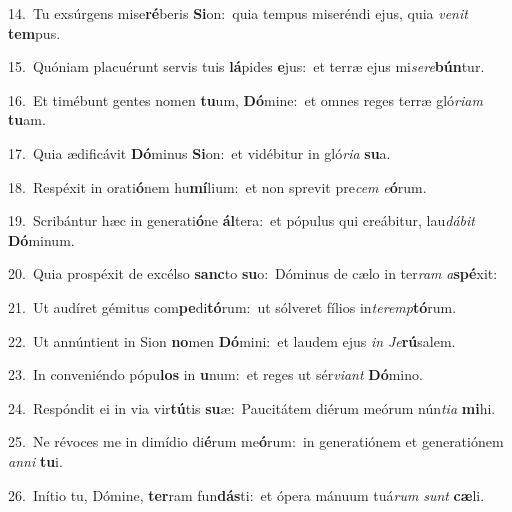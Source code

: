 {\numbfont\textcolor{\numbcolor}{14.}}~Tu exsúrgens mise\-\textbf{ré}\-beris \textbf{Si}\-on:~\star quia tempus miseréndi ejus, quia \textit{ve}\-\textit{nit} \textbf{tem}\-pus.\par
{\numbfont\textcolor{\numbcolor}{15.}}~Quóniam placuérunt servis tuis \textbf{lá}\-pides \textbf{e}\-jus:~\star et terræ ejus mi\-\textit{se}\-\textit{re}\textbf{bún}tur.\par
{\numbfont\textcolor{\numbcolor}{16.}}~Et timébunt gentes nomen \textbf{tu}\-um, \textbf{Dó}\-mine:~\star et omnes reges terræ gló\-\textit{ri}\-\textit{am} \textbf{tu}\-am.\par
{\numbfont\textcolor{\numbcolor}{17.}}~Quia ædificávit \textbf{Dó}\-minus \textbf{Si}\-on:~\star et vidébitur in gló\-\textit{ri}\-\textit{a} \textbf{su}\-a.\par
{\numbfont\textcolor{\numbcolor}{18.}}~Respéxit in orati\-\textbf{ó}\-nem hu\-\textbf{mí}\-lium:~\star et non sprevit pre\textit{cem} \textit{e}\-\textbf{ó}rum.\par
{\numbfont\textcolor{\numbcolor}{19.}}~Scribántur hæc in generati\-\textbf{ó}\-ne \textbf{ál}\-tera:~\star et pópulus qui creábitur, lau\-\textit{dá}\-\textit{bit} \textbf{Dó}\-minum.\par
{\numbfont\textcolor{\numbcolor}{20.}}~Quia prospéxit de excélso \textbf{sanc}\-to \textbf{su}\-o:~\star Dóminus de cælo in ter\textit{ram} \textit{a}\-\textbf{spé}xit:\par
{\numbfont\textcolor{\numbcolor}{21.}}~Ut audíret gémitus com\-\textbf{pe}\-di\-\textbf{tó}\-rum:~\star ut sólveret fílios in\-\textit{ter}\-\textit{emp}\textbf{tó}rum.\par
{\numbfont\textcolor{\numbcolor}{22.}}~Ut annúntient in Sion \textbf{no}\-men \textbf{Dó}\-mini:~\star et laudem ejus \textit{in} \textit{Je}\-\textbf{rú}salem.\par
{\numbfont\textcolor{\numbcolor}{23.}}~In conveniéndo pópu\textbf{los} in \textbf{u}\-num:~\star et reges ut sér\-\textit{vi}\-\textit{ant} \textbf{Dó}\-mino.\par
{\numbfont\textcolor{\numbcolor}{24.}}~Respóndit ei in via vir\-\textbf{tú}\-tis \textbf{su}\-æ:~\star Paucitátem diérum meórum nún\-\textit{ti}\-\textit{a} \textbf{mi}\-hi.\par
{\numbfont\textcolor{\numbcolor}{25.}}~Ne révoces me in dimídio di\-\textbf{é}\-rum me\-\textbf{ó}\-rum:~\star in generatiónem et generatiónem \textit{an}\-\textit{ni} \textbf{tu}\-i.\par
{\numbfont\textcolor{\numbcolor}{26.}}~Inítio tu, Dómine, \textbf{ter}\-ram fun\-\textbf{dás}\-ti:~\star et ópera mánuum tuá\textit{rum} \textit{sunt} \textbf{cæ}\-li.\par
